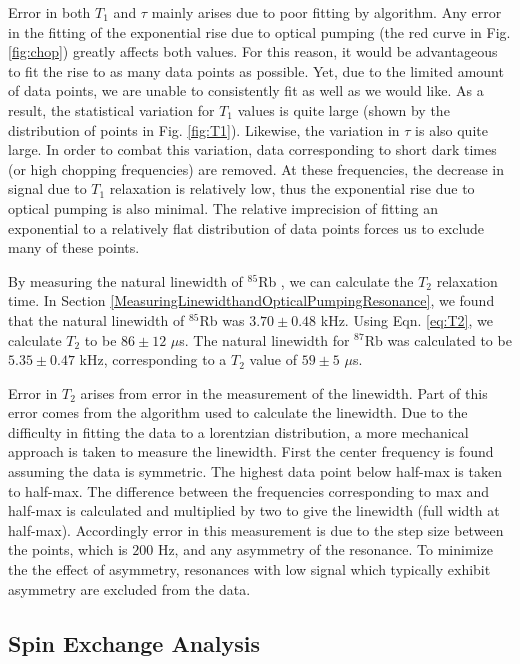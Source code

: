 Error in both $T_1$ and $\tau$ mainly arises due to poor fitting by algorithm.  Any error in the fitting of the exponential rise due to optical pumping (the red curve in Fig. \ref{fig:chop}) greatly affects both values.  For this reason, it would be advantageous to fit the rise to as many data points as possible. Yet, due to the limited amount of data points, we are unable to consistently fit as well as we would like.  As a result, the statistical variation for $T_1$ values is quite large (shown by the distribution of points in Fig. \ref{fig:T1}). Likewise, the variation in $\tau$ is also quite large.  In order to combat this variation, data corresponding to short dark times (or high chopping frequencies) are removed.  At these frequencies, the decrease in signal due to $T_1$ relaxation is relatively low, thus the exponential rise due to optical pumping is also minimal.  The relative imprecision of fitting an exponential to a relatively flat distribution of data points forces us to exclude many of these points.


By measuring the natural linewidth of $^{85}$Rb , we can calculate the $T_2$ relaxation time.  In Section \ref{MeasuringLinewidthandOpticalPumpingResonance}, we found that the natural linewidth of $^{85}$Rb was $3.70 \pm 0.48$ kHz.  Using Eqn. \ref{eq:T2}, we calculate $T_2$ to be $86 \pm 12$ $\mu$s. The natural linewidth for $^{87}$Rb was calculated to be $5.35 \pm 0.47$ kHz, corresponding to a $T_2$ value of  $59 \pm 5$ $\mu$s.

Error in $T_2$ arises from error in the measurement of the linewidth. Part of this error comes from the algorithm used to calculate the linewidth.  Due to the difficulty in fitting the data to a lorentzian distribution, a more mechanical approach is taken to measure the linewidth. First the center frequency is found assuming  the data is symmetric. The highest data point below half-max is taken to half-max.  The difference between the frequencies corresponding to max and half-max is calculated and multiplied by two to give the linewidth (full width at half-max).  Accordingly error in this measurement is due to the step size between the points, which is $200$ Hz, and  any asymmetry of the resonance.  To minimize the the effect of asymmetry, resonances with low signal which typically exhibit asymmetry are excluded from the data.


\subsection{Spin Exchange Analysis}\label{SpinExchangeAnalysis}

